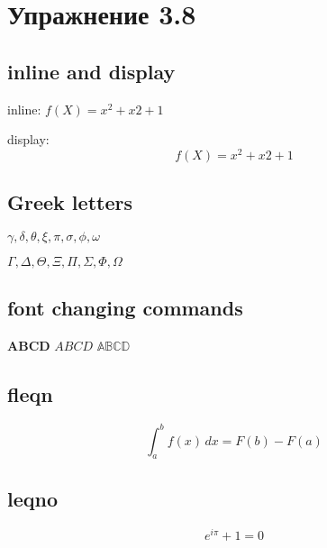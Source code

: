 \documentclass{article}
\begin{document}
\section*{Упражнение 3.8}

\subsection*{inline and display}
inline: $ f(X) = x^2 + x2 + 1$

display: 
\[
f(X) = x^2 + x2 + 1
\]

\subsection*{ Greek letters}

$\gamma, \delta, \theta, \xi, \pi, \sigma, \phi, \omega$

$\Gamma, \Delta, \Theta, \Xi, \Pi, \Sigma, \Phi, \Omega$


\subsection*{ font changing commands}

$\mathrm{\mathbf{ABCD}}$
$\mathbf{\mathit{ABCD}}$
$\mathsf{\mathbb{ABCD}}$



\subsection{fleqn}
 \[
 \int_a^b f(x)\,dx = F(b) - F(a)
 \]
 
 
\subsection{leqno}
\begin{equation}
e^{i\pi} + 1 = 0
\end{equation}
 
 
 
\end{document}
